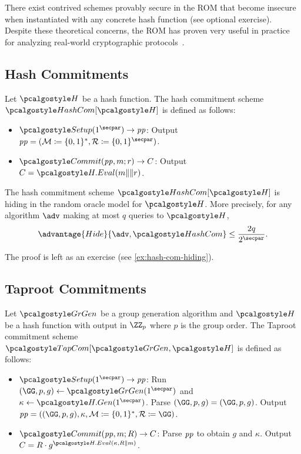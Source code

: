   There exist contrived schemes provably secure in the ROM that become insecure when instantiated with any concrete hash function (see optional exercise).
  Despite these theoretical concerns, the ROM has proven very useful in practice for analyzing real-world cryptographic protocols~\cite{DCC:KobMen15}.

\subsection{Hash Commitments}

\begin{definition}
  Let $\algo{H}$ be a hash function.
  The hash commitment scheme $\algo{HashCom}[\algo{H}]$ is defined as follows:
  \begin{itemize}
    \item $\algo{Setup}(1^\secpar) \rightarrow \params$: Output $\params = (\mathcal{M} \defeq \{0, 1\}^*, \mathcal{R} \defeq \{0, 1\}^\secpar)$.
    \item $\algo{Commit}(\params, m; r) \rightarrow C$: Output $C = \algo{H.Eval}(m \|\| r)$.
  \end{itemize}
\end{definition}

\begin{lemma}\label{lem:hash-com-hiding}
  The hash commitment scheme $\algo{HashCom}[\algo{H}]$ is hiding in the random oracle model for $\algo{H}$.
  More precisely, for any algorithm $\adv$ making at most $q$ queries to $\algo{H}$,
  \[
  \advantage{Hide}{\adv, \algo{HashCom}} \leq \frac{2q}{2^\secpar}.
  \]
\end{lemma}

The proof is left as an exercise (see \autoref{ex:hash-com-hiding}).

\subsection{Taproot Commitments}

\begin{definition}
  Let $\grgen$ be a group generation algorithm and $\algo{H}$ be a hash function with output in $\ZZ_p$ where $p$ is the group order. 
  The Taproot commitment scheme $\algo{TapCom}[\grgen, \algo{H}]$ is defined as follows:
  \begin{itemize}
    \item $\algo{Setup}(1^\secpar) \rightarrow \params$: Run $\gparam \gets \grgen(1^\secpar)$ and $\kappa \gets \algo{H.Gen}(1^\secpar)$. Parse $\gparam = (\GG, p, g)$. Output $\params = (\gparam, \kappa, \mathcal{M} \defeq \{0,1\}^*, \mathcal{R} \defeq \GG)$.
    \item $\algo{Commit}(\params, m; R) \rightarrow C$: Parse $\mathit{pp}$ to obtain $g$ and $\kappa$. Output $C = R \cdot g^{\algo{H.Eval}(\kappa, R \| m)}$.
  \end{itemize}
\end{definition}

